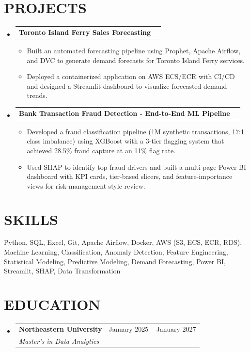 \documentclass[letterpaper,11pt]{article}
\makeatletter
\newcommand{\resumeItem}[1]{\item{#1 \vspace{-2pt}}}
\newcommand{\resumeSubheading}[4]{
  \vspace{-2pt}\item
    \begin{tabular*}{0.97\textwidth}[t]{l@{\extracolsep{\fill}}r}
      \textbf{#1} & #2 \\
      \textit{#3} & \textit{#4} \\
    \end{tabular*}\vspace{-7pt}
}
\newcommand{\resumeProjectHeading}[2]{
    \item
    \begin{tabular*}{0.97\textwidth}{l@{\extracolsep{\fill}}r}
      #1 & #2 \\
    \end{tabular*}\vspace{-7pt}
}
\newcommand{\resumeSubHeadingListStart}{\begin{itemize}[leftmargin=0pt, label={}]}
\newcommand{\resumeSubHeadingListEnd}{\end{itemize}}
\newcommand{\resumeItemListStart}{\begin{itemize}[leftmargin=0.2in, label={$\bullet$}]}
\newcommand{\resumeItemListEnd}{\end{itemize}\vspace{-5pt}}
\makeatother
\begin{document}
\section{\MakeUppercase{Projects}}
\resumeSubHeadingListStart
\resumeProjectHeading
  {\textbf{Toronto Island Ferry Sales Forecasting}}{}
\resumeItemListStart
  \resumeItem{Built an automated forecasting pipeline using Prophet, Apache Airflow, and DVC to generate demand forecasts for Toronto Island Ferry services.}
  \resumeItem{Deployed a containerized application on AWS ECS/ECR with CI/CD and designed a Streamlit dashboard to visualize forecasted demand trends.}
\resumeItemListEnd
\resumeProjectHeading
  {\textbf{Bank Transaction Fraud Detection - End-to-End ML Pipeline}}{}
\resumeItemListStart
  \resumeItem{Developed a fraud classification pipeline (1M synthetic transactions, 17:1 class imbalance) using XGBoost with a 3-tier flagging system that achieved 28.5\% fraud capture at an 11\% flag rate.}
  \resumeItem{Used SHAP to identify top fraud drivers and built a multi-page Power BI dashboard with KPI cards, tier-based slicers, and feature-importance views for risk-management style review.}
\resumeItemListEnd
\resumeSubHeadingListEnd

\section{\MakeUppercase{Skills}}
\begin{itemize}[leftmargin=0.01in, label={}]
    \small{\item{Python, SQL, Excel, Git, Apache Airflow, Docker, AWS (S3, ECS, ECR, RDS), Machine Learning, Classification, Anomaly Detection, Feature Engineering, Statistical Modeling, Predictive Modeling, Demand Forecasting, Power BI, Streamlit, SHAP, Data Transformation}}
\end{itemize}


\section{\MakeUppercase{Education}}
\resumeSubHeadingListStart
\resumeSubheading
  {Northeastern University}{January 2025 -- January 2027}
  {Master's in Data Analytics}{}
\resumeSubHeadingListEnd
\end{document}
